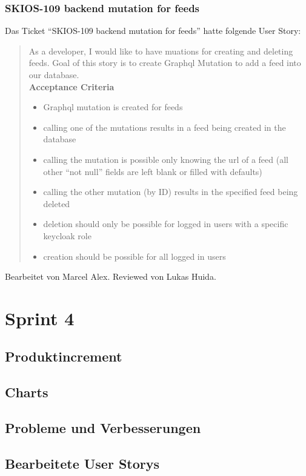 \subsubsection{SKIOS-109 backend mutation for feeds}
Das Ticket \enquote{SKIOS-109 backend mutation for feeds} hatte folgende User Story:
\begin{quotation}
As a developer, I would like to have muations for creating and deleting feeds.
Goal of this story is to create Graphql Mutation to add a feed into our database. \\
\textbf{Acceptance Criteria}
\begin{itemize}
    \item Graphql mutation is created for feeds
    \item calling one of the mutations results in a feed being created in the database
    \item calling the mutation is possible only knowing the url of a feed (all other “not null” fields are left blank or filled with defaults)
    \item calling the other mutation (by ID) results in the specified feed being deleted
    \item deletion should only be possible for logged in users with a specific keycloak role
    \item creation should be possible for all logged in users
\end{itemize}
\end{quotation}
Bearbeitet von Marcel Alex.
Reviewed von Lukas Huida.

\section{Sprint 4}
\subsection{Produktincrement}
\subsection{Charts}
\subsection{Probleme und Verbesserungen}

\subsection{Bearbeitete User Storys}


